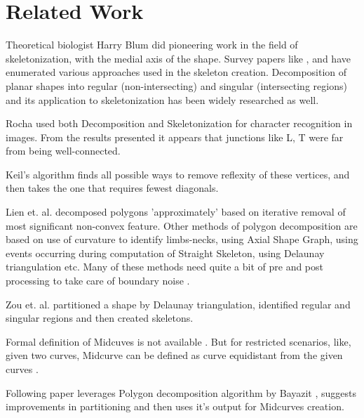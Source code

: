 
\section{Related Work}	

Theoretical biologist Harry Blum \cite{Harry1967} did pioneering work in the field of skeletonization, with the medial axis of the shape. Survey papers like \cite{Attali2004}, \cite{Lam1992} and \cite{Yogesh2010} have enumerated various approaches used in the skeleton creation. Decomposition of planar shapes  into regular (non-intersecting) and singular (intersecting regions) and its application to skeletonization has been widely researched \cite{Rocha99} as well.

Rocha \cite{Rocha98, Rocha99} used both Decomposition and Skeletonization for character recognition in images. From the results presented it appears that junctions like L, T were far from being well-connected. 

Keil's algorithm \cite{Keil94} finds all possible ways to remove reflexity  of  these  vertices,  and  then  takes  the  one  that  requires  fewest diagonals. 

Lien et. al. \cite{Lien2004} decomposed polygons 'approximately' based on iterative removal of most significant non-convex feature. Other methods of polygon decomposition are based on use of curvature to identify limbs-necks, using Axial Shape Graph, using events occurring during computation of Straight Skeleton, using Delaunay triangulation etc. Many of these methods need quite a bit of pre and post processing to take care of boundary noise \cite{Lien2004}. 

Zou et. al.\cite{Zou2001} partitioned a shape by Delaunay triangulation, identified regular and singular regions and then created skeletons.

Formal definition of Midcuves is not available \cite{Ramanathan2004}. But for restricted scenarios, like, given two curves, Midcurve can be defined as curve equidistant from the given curves \cite{Elber1999}.

Following paper leverages Polygon decomposition algorithm by Bayazit \cite{Bayazit}, suggests improvements in partitioning and then uses it's output for Midcurves creation.

